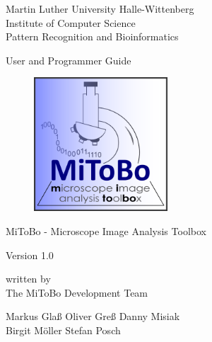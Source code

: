 \documentclass[11pt,a4paper,english]{report}
\begin{document}

\thispagestyle{empty}

\begin{flushleft}
\large{Martin Luther University Halle-Wittenberg} \\
\normalsize{Institute of Computer Science} \\
\normalsize{Pattern Recognition and Bioinformatics}
\end{flushleft}

\vspace*{1cm}

\hrulefill

\vspace*{2cm}

\begin{center}

\large{User and Programmer Guide} \\
\vspace*{0.5cm}

  \begin{figure}[htbp]
    \centering
     \includegraphics[width = 5cm]{../images/MiToBo_logo.pdf}
  \end{figure}
\Large{
MiToBo - Microscope Image Analysis Toolbox 
}

\vspace*{0.7cm}

\large{
Version 1.0
}
\vspace*{0.5cm}

\normalsize{written by}\\
\vspace*{1.0cm}
\large{The MiToBo Development Team}\\
\vspace*{1.0cm}
\end{center}

\begin{center}
{\Large
{Markus Gla\ss} \hspace*{1cm} {Oliver Gre\ss} \hspace*{1cm} {Danny Misiak}\\[1cm]
       {Birgit M\"oller} \hspace*{1cm} {Stefan Posch} 
}
\end{center}
\end{document}
